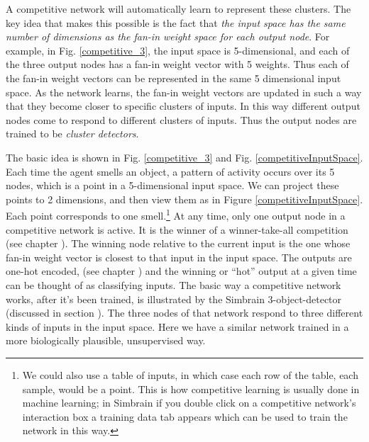 A competitive network will automatically learn to represent these clusters. The key idea that makes this possible is the fact that {\it the input space has the same number of dimensions as the fan-in weight space for each output node}. For example, in Fig. \ref{competitive_3}, the input space is 5-dimensional, and each of the three output nodes has a fan-in weight vector with 5 weights. Thus each of the fan-in weight vectors can be represented in the same 5 dimensional input space. As the network learns, the fan-in weight vectors are updated in such a way that they become closer to specific clusters of inputs. In this way different output nodes come to respond to different clusters of inputs. Thus the output nodes are trained to be \emph{cluster detectors}.

The basic idea is shown in Fig. \ref{competitive_3} and Fig. \ref{competitiveInputSpace}. Each time the agent smells an object, a pattern of activity occurs over its 5 nodes, which is a point in a 5-dimensional input space. We can project these points to 2 dimensions, and then view them as in Figure \ref{competitiveInputSpace}. Each point corresponds to one smell.\footnote{We could also use a table of inputs, in which case each row of the table, each sample, would be a point. This is how competitive learning is usually done in machine learning; in Simbrain if you double click on a competitive network's interaction box a training data tab appears which can be used to train the network in this way.} At any time, only one output node in a competitive network is active. It is the winner of a winner-take-all competition (see chapter ). The winning node relative to the current input is the one whose fan-in weight vector is closest to that input in the input space. The outputs are one-hot encoded, (see chapter ) and the winning or ``hot'' output at a given time can be thought of as classifying inputs. The basic way a competitive network works, after it's been trained, is illustrated by the Simbrain 3-object-detector (discussed in section ). The three nodes of that network respond to three different kinds of inputs in the input space. Here we have a similar network trained in a more biologically plausible, unsupervised way.

